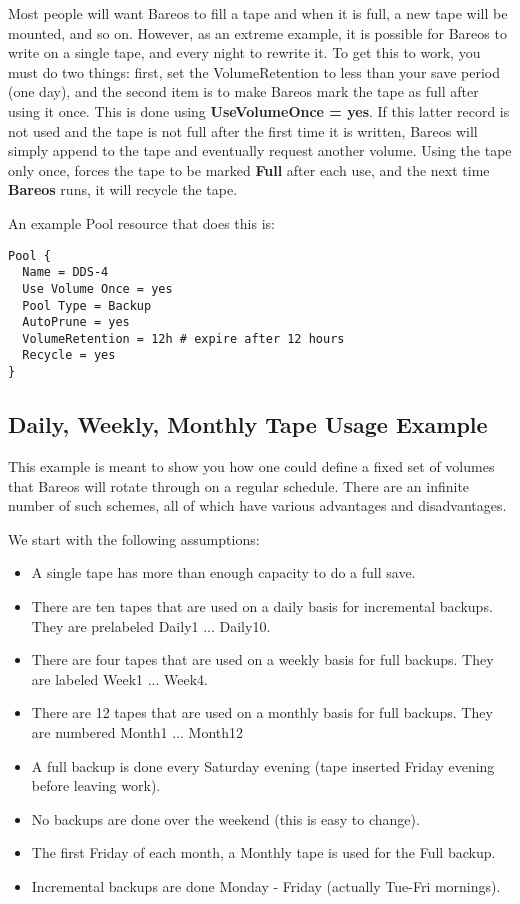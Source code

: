 Most people will want Bareos to fill a tape and when it is full, a new tape
will be mounted, and so on. However, as an extreme example, it is possible for
Bareos to write on a single tape, and every night to rewrite it. To get this
to work, you must do two things: first, set the VolumeRetention to less than
your save period (one day), and the second item is to make Bareos mark the
tape as full after using it once. This is done using {\bf UseVolumeOnce =
yes}. If this latter record is not used and the tape is not full after the
first time it is written, Bareos will simply append to the tape and eventually
request another volume. Using the tape only once, forces the tape to be marked
{\bf Full} after each use, and the next time {\bf Bareos} runs, it will
recycle the tape.

An example Pool resource that does this is:

\footnotesize
\begin{verbatim}
Pool {
  Name = DDS-4
  Use Volume Once = yes
  Pool Type = Backup
  AutoPrune = yes
  VolumeRetention = 12h # expire after 12 hours
  Recycle = yes
}
\end{verbatim}
\normalsize

\subsection{Daily, Weekly, Monthly Tape Usage Example}
\label{usageexample}

This example is meant to show you how one could define a fixed set of volumes
that Bareos will rotate through on a regular schedule. There are an infinite
number of such schemes, all of which have various advantages and
disadvantages.

We start with the following assumptions:

\begin{itemize}
\item A single tape has more than enough capacity to do  a full save.
\item There are ten tapes that are used on a daily basis  for incremental
   backups. They are prelabeled Daily1 ...  Daily10.
\item There are four tapes that are used on a weekly basis  for full backups.
   They are labeled Week1 ... Week4.
\item There are 12 tapes that are used on a monthly basis  for full backups.
   They are numbered Month1 ... Month12
\item A full backup is done every Saturday evening (tape inserted  Friday
   evening before leaving work).
\item No backups are done over the weekend (this is easy to  change).
\item The first Friday of each month, a Monthly tape is used for  the Full
   backup.
\item Incremental backups are done Monday - Friday (actually  Tue-Fri
   mornings).
   \end{itemize}

